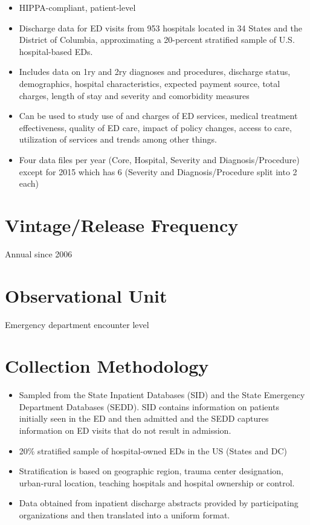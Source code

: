 \documentclass[
]{book}
\providecommand{\tightlist}{%
  \setlength{\itemsep}{0pt}\setlength{\parskip}{0pt}}
\begin{document}
\begin{itemize}
\tightlist
\item
  HIPPA-compliant, patient-level
\item
  Discharge data for ED visits from 953 hospitals located in 34 States and the District of Columbia, approximating a 20-percent stratified sample of U.S. hospital-based EDs.
\item
  Includes data on 1ry and 2ry diagnoses and procedures, discharge status, demographics, hospital characteristics, expected payment source, total charges, length of stay and severity and comorbidity measures
\item
  Can be used to study use of and charges of ED services, medical treatment effectiveness, quality of ED care, impact of policy changes, access to care, utilization of services and trends among other things.
\item
  Four data files per year (Core, Hospital, Severity and Diagnosis/Procedure) except for 2015 which has 6 (Severity and Diagnosis/Procedure split into 2 each)
\end{itemize}

\hypertarget{vintagerelease-frequency-70}{%
\section{Vintage/Release Frequency}\label{vintagerelease-frequency-70}}

Annual since 2006

\hypertarget{observational-unit-70}{%
\section{Observational Unit}\label{observational-unit-70}}

Emergency department encounter level

\hypertarget{collection-methodology-70}{%
\section{Collection Methodology}\label{collection-methodology-70}}

\begin{itemize}
\tightlist
\item
  Sampled from the State Inpatient Databases (SID) and the State Emergency Department Databases (SEDD). SID contains information on patients initially seen in the ED and then admitted and the SEDD captures information on ED visits that do not result in admission.
\item
  20\% stratified sample of hospital-owned EDs in the US (States and DC)
\item
  Stratification is based on geographic region, trauma center designation, urban-rural location, teaching hospitals and hospital ownership or control.
\item
  Data obtained from inpatient discharge abstracts provided by participating organizations and then translated into a uniform format.
\end{itemize}
\end{document}
